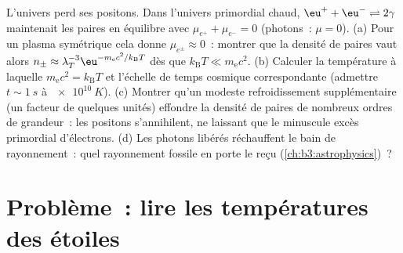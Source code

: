 \begin{exercise}[$\star\star\star$]\label{exo:b3:grand-canonical:12}
L'univers perd ses positons. Dans l'univers primordial chaud,
$\eu^+ + \eu^- \rightleftharpoons 2\gamma$ maintenait les paires en
équilibre avec $\mu_{e^+} + \mu_{e^-} = 0$ (photons~: $\mu = 0$).
(a) Pour un plasma symétrique cela donne $\mu_{e^\pm} \approx 0$~:
montrer que la densité de paires vaut alors $n_\pm \approx
\lambda_T^{-3}\eu^{-m_{\text{e}}c^2/k_{\text{B}}T}$ dès que
$k_{\text{B}}T \ll m_{\text{e}}c^2$. (b) Calculer la température à
laquelle $m_{\text{e}}c^2 = k_{\text{B}}T$ et l'échelle de temps
cosmique correspondante (admettre $t \sim \qty{1}{s}$ à
$\qty{e10}{K}$). (c) Montrer qu'un modeste refroidissement
supplémentaire (un facteur de quelques unités) effondre la densité de
paires de nombreux ordres de grandeur~: les positons s'annihilent, ne
laissant que le minuscule excès primordial d'électrons. (d) Les
photons libérés réchauffent le bain de rayonnement~: quel rayonnement
fossile en porte le reçu (\cref{ch:b3:astrophysics})~?
\end{exercise}

\section{Problème~: lire les températures des étoiles}

